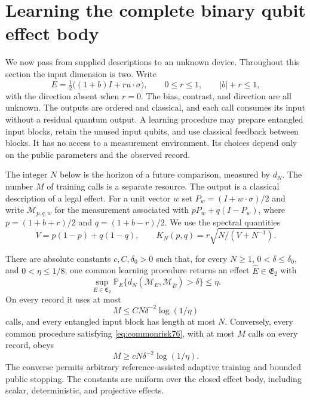 \section{Learning the complete binary qubit effect body}
\label{sec:commonlearn76}

We now pass from supplied descriptions to an unknown device.  Throughout
this section the input dimension is two.  Write
\[
 E=\tfrac12\bigl((1+b)I+r u\cdot\sigma\bigr),\qquad
 0\le r\le1,\qquad |b|+r\le1,
\]
with the direction absent when $r=0$.  The bias, contrast, and direction
are all unknown.  The outputs are ordered and classical, and each call
consumes its input without a residual quantum output.  A learning
procedure may prepare entangled input blocks, retain the unused input
qubits, and use classical feedback between blocks.  It has no access
to a measurement environment.  Its choices depend only on the public
parameters and the observed record.

The integer $N$ below is the horizon of a future comparison, measured
by $d_N$.  The number $M$ of training calls is a separate resource.
The output is a classical description of a legal effect.
For a unit vector $w$ set $P_w=(I+w\cdot\sigma)/2$ and write
$\mathcal M_{p,q,w}$ for the measurement associated with
$pP_w+q(I-P_w)$, where $p=(1+b+r)/2$ and $q=(1+b-r)/2$.
We use the spectral quantities
\[
 V=p(1-p)+q(1-q),\qquad
 K_N(p,q)=r\sqrt{N/(V+N^{-1})}.
\]

\begin{theorem}
\label{thm:commonlearn76}
There are absolute constants $c,C,\delta_0>0$ such that, for every
$N\ge1$, $0<\delta\le\delta_0$, and $0<\eta\le1/8$, one common
learning procedure returns an effect $\widehat E\in\mathfrak E_2$ with
\begin{equation}\label{eq:commonrisk76}
 \sup_{E\in\mathfrak E_2}
  \mathbb P_E\{d_N(\mathcal M_E,\mathcal M_{\widehat E})>\delta\}
       \le\eta.
\end{equation}
On every record it uses at most
\begin{equation}\label{eq:commoncalls76}
 M\le C N\delta^{-2}\log(1/\eta)
\end{equation}
calls, and every entangled input block has length at most $N$.
Conversely, every common procedure satisfying
\eqref{eq:commonrisk76}, with at most $M$ calls on every record,
obeys
\begin{equation}\label{eq:commonlower76}
 M\ge cN\delta^{-2}\log(1/\eta).
\end{equation}
The converse permits arbitrary reference-assisted adaptive training
and bounded public stopping.  The constants are uniform over the
closed effect body, including scalar, deterministic, and projective
effects.
\end{theorem}

